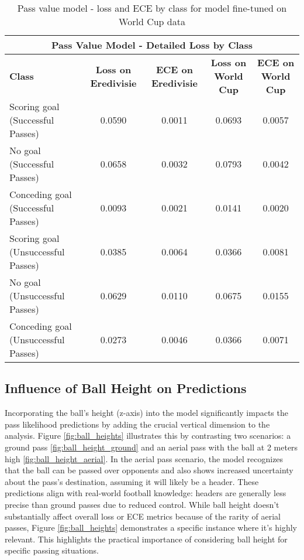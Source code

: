 \begin{table}[h!]
\centering
\caption{Pass value model - loss and ECE by class for model fine-tuned on World Cup data}
\label{tab:detailed_loss_by_class_test_world_cup}
\footnotesize

\vspace{3mm}
\begin{tabular}{|l|c|c|c|c|}
\hline
\multicolumn{5}{|c|}{\textbf{Pass Value Model - Detailed Loss by Class}} \\ \hline
\textbf{Class} & \textbf{Loss on Eredivisie} & \textbf{ECE on Eredivisie} & \textbf{Loss on World Cup} & \textbf{ECE on World Cup} \\ \hline
Scoring goal (Successful Passes) & 0.0590 & 0.0011 & 0.0693 & 0.0057 \\ \hline
No goal (Successful Passes) & 0.0658 & 0.0032 & 0.0793 & 0.0042 \\ \hline
Conceding goal (Successful Passes) & 0.0093 &0.0021 & 0.0141 &0.0020 \\ \hline
Scoring goal (Unsuccessful Passes) & 0.0385 & 0.0064 & 0.0366 & 0.0081 \\ \hline
No goal (Unsuccessful Passes) & 0.0629 & 0.0110 & 0.0675 & 0.0155 \\ \hline
Conceding goal (Unsuccessful Passes) & 0.0273 & 0.0046 & 0.0366 & 0.0071 \\ \hline
\end{tabular}
\end{table}



\subsection{Influence of Ball Height on Predictions}
Incorporating the ball's height (z-axis) into the model significantly impacts the pass likelihood predictions by adding the crucial vertical dimension to the analysis. Figure \ref{fig:ball_heights} illustrates this by contrasting two scenarios: a ground pass \ref{fig:ball_height_ground} and an aerial pass with the ball at 2 meters high \ref{fig:ball_height_aerial}. In the aerial pass scenario, the model recognizes that the ball can be passed over opponents and also shows increased uncertainty about the pass's destination, assuming it will likely be a header. These predictions align with real-world football knowledge: headers are generally less precise than ground passes due to reduced control. While ball height doesn't substantially affect overall loss or ECE metrics because of the rarity of aerial passes, Figure \ref{fig:ball_heights} demonstrates a specific instance where it's highly relevant. This highlights the practical importance of considering ball height for specific passing situations. 

